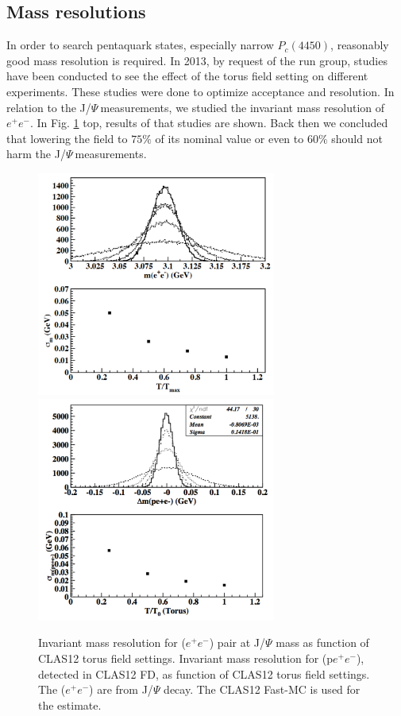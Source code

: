 \documentclass[12pt]{revtex4}
\newcommand{\JP}{J/$\Psi~$}
\begin{document}
\subsection{Mass resolutions} 

In order to search pentaquark states, especially narrow $P_c(4450)$, reasonably good mass resolution is required. In 2013, by request of the run group, studies have been conducted to see the effect of the torus field setting on different experiments. These studies were done to optimize acceptance and resolution. In relation to the \JP measurements, we studied the invariant mass resolution of $e^+e^-$. In Fig. \ref{fig:jp_mres} top, results of that studies are shown. Back then we concluded that lowering the field to $75\%$ of its nominal value or even to $60\%$ should not harm the \JP measurements.
\begin{figure}[htbp]
\begin{center}
\includegraphics[width=0.7\textwidth]{jp_mass_res.pdf}
\includegraphics[width=0.7\textwidth]{pee_mass_res.pdf}
\caption{Invariant mass resolution for ($e^+e^-$) pair at J/$\Psi$ mass as function of CLAS12 torus field settings. Invariant mass resolution for (p$e^+e^-$), detected in CLAS12 FD, as function of CLAS12 torus field settings. The ($e^+e^-$) are from J/$\Psi$ decay. The CLAS12 Fast-MC is used for the estimate.}
\label{fig:jp_mres}
\end{center}
\end{figure}
\end{document}
